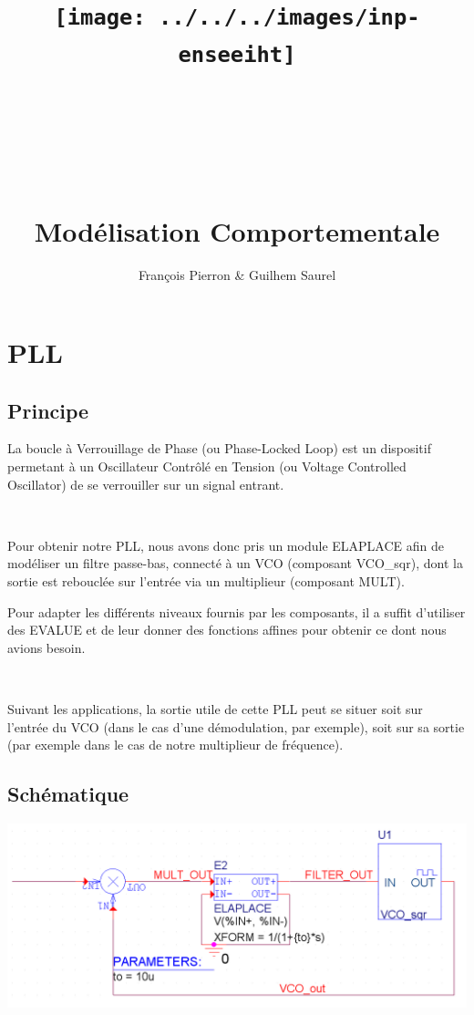 \documentclass[11pt]{article}
\title{\texttt{[image: ../../../images/inp-enseeiht]} \\ ~ \\ ~ \\ ~ \\ ~ \\ Modélisation Comportementale}
\author{François Pierron \& Guilhem Saurel}
\date{\oldstylenums{\today}}
\begin{document}
\begin{titlepage}
    \setcounter{page}{0}
    \maketitle
    \vfill
    \tableofcontents
    \thispagestyle{empty}
\end{titlepage}

\section{PLL}

\subsection{Principe}
La boucle à Verrouillage de Phase (ou Phase-Locked Loop) est un dispositif permetant à un Oscillateur Contrôlé en Tension (ou Voltage Controlled Oscillator) de se verrouiller sur un signal entrant.

~

Pour obtenir notre PLL, nous avons donc pris un module ELAPLACE afin de modéliser un filtre passe-bas, connecté à un VCO (composant VCO\_sqr), dont la sortie est rebouclée sur l’entrée via un multiplieur (composant MULT).

Pour adapter les différents niveaux fournis par les composants, il a suffit d’utiliser des EVALUE et de leur donner des fonctions affines pour obtenir ce dont nous avions besoin.

~

Suivant les applications, la sortie utile de cette PLL peut se situer soit sur l’entrée du VCO (dans le cas d’une démodulation, par exemple), soit sur sa sortie (par exemple dans le cas de notre multiplieur de fréquence).

\subsection{Schématique}

\includegraphics[width=\linewidth]{pll_sch.png}
\end{document}
